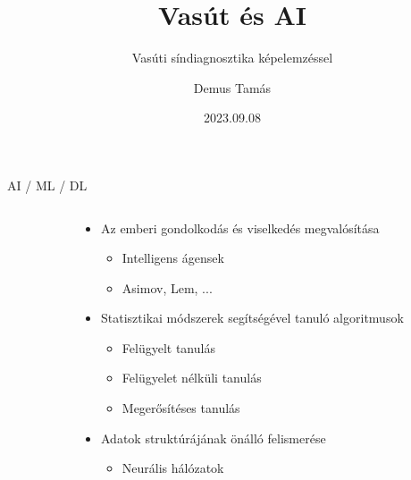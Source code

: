 \documentclass[aspectratio=169]{beamer}
\title{Vasút és AI}
\subtitle{Vasúti síndiagnosztika képelemzéssel}
\author{Demus Tamás}
\date{2023.09.08}
\begin{document}
\maketitle

\begin{frame}{AI / ML / DL}
    \begin{columns}[T]
        \begin{column}{0.4\textwidth}
            
        \end{column}
        \begin{column}{0.5\textwidth}
            \begin{itemize}
                \setlength\itemsep{1em}
                \item [AI:] Az emberi gondolkodás és viselkedés megvalósítása
                      \begin{itemize}
                          \item Intelligens ágensek
                          \item Asimov, Lem, ...
                      \end{itemize}
                \item [ML:] Statisztikai módszerek segítségével tanuló algoritmusok
                      \begin{itemize}
                          \item Felügyelt tanulás
                          \item Felügyelet nélküli tanulás
                          \item Megerősítéses tanulás
                      \end{itemize}
                \item [DL:] Adatok struktúrájának önálló felismerése
                      \begin{itemize}
                          \item Neurális hálózatok
                      \end{itemize}
            \end{itemize}
        \end{column}
    \end{columns}
\end{frame}
\end{document}
